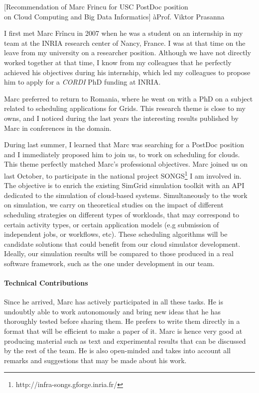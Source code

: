 \documentclass[a4paper,10pt]{article}
\begin{document}

\begin{letter}[Recommendation of Marc Frincu for USC PostDoc position\\
on Cloud Computing and Big Data Informatics]%
{à}{Prof. Viktor Prasanna}
 

I first met Marc  Fr\^incu in 2007 when he was a student  on an internship in my
team at the  INRIA research center of Nancy,  France. I was at that  time on the
leave from my university on a researcher position. Although we have not directly
worked  together at  that time,  I  know from  my colleagues  that he  perfectly
achieved  his objectives  during  his  internship, which  led  my colleagues  to
propose him to apply for a \emph{CORDI} PhD funding at INRIA.

Marc preferred to  return to Romania, where he  went on with a PhD  on a subject
related to scheduling applications for Grids. This research theme is close to my
owns, and I  noticed during the last years the  interesting results published by
Marc in conferences in the domain.

During last summer, I learned that Marc was searching for a PostDoc position and
I immediately proposed  him to join us,  to work on scheduling  for clouds. This
theme perfectly matched  Marc's professional objectives. Marc joined  us on last
October,       to      participate       in      the       national      project
SONGS\footnote{http://infra-songs.gforge.inria.fr/}  I  am   involved  in.   The
objective  is to  enrich the  existing SimGrid  simulation toolkit  with an  API
dedicated to the  simulation of cloud-based systems. Simultaneously  to the work
on  simulation, we  carry  on theoretical  studies on  the  impact of  different
scheduling strategies  on different types  of workloads, that may  correspond to
certain  activity  types,  or  certain application  models  (e.g  submission  of
independent  jobs, or  workflows,  etc).  These  scheduling  algorithms will  be
candidate solutions  that could  benefit from  our cloud  simulator development.
Ideally, our  simulation results will  be compared to  those produced in  a real
software framework, such as the one under development in our team.


\paragraph{Technical Contributions}
Since he  arrived, Marc has  actively participated in  all these tasks. He is
undoubtly able to work autonomously and bring new ideas that he has thoroughly
tested before sharing them. He prefers to write them directly in a format that
will be efficient to make a paper of it. Marc is hence very good at producing
material such as text and experimental results that can be discussed by the 
rest of the team. He is also open-minded and takes into account all remarks
and suggestions that may be made about his work.


\end{letter}
\end{document}
